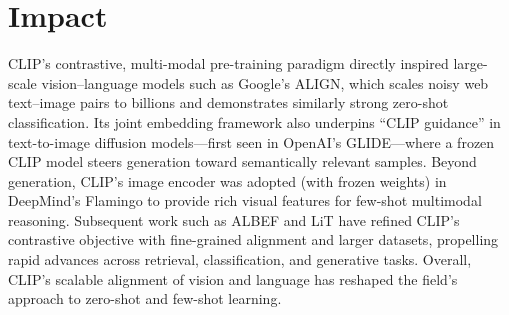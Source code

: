 \documentclass[10pt]{article}
\begin{document}
\section*{Impact}
CLIP's contrastive, multi-modal pre-training paradigm directly inspired large-scale vision–language models such as Google's ALIGN\cite{DBLP:journals/corr/abs-2102-05918}, which scales noisy web text–image pairs to billions and demonstrates similarly strong zero-shot classification. Its joint embedding framework also underpins “CLIP guidance” in text-to-image diffusion models—first seen in OpenAI's GLIDE\cite{DBLP:journals/corr/abs-2112-10741}—where a frozen CLIP model steers generation toward semantically relevant samples. Beyond generation, CLIP's image encoder was adopted (with frozen weights) in DeepMind's Flamingo\cite{alayrac2022flamingovisuallanguagemodel} to provide rich visual features for few-shot multimodal reasoning. Subsequent work such as ALBEF\cite{DBLP:journals/corr/abs-2107-07651} and LiT\cite{DBLP:journals/corr/abs-2111-07991} have refined CLIP's contrastive objective with fine-grained alignment and larger datasets, propelling rapid advances across retrieval, classification, and generative tasks. Overall, CLIP's scalable alignment of vision and language has reshaped the field's approach to zero-shot and few-shot learning.



\end{document}
